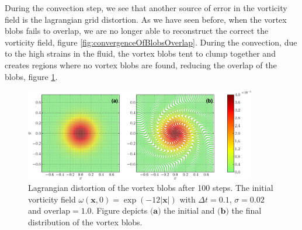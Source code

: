 During the convection step, we see that another source of error in the vorticity field is the lagrangian grid distortion. As we have seen before, when the vortex blobs fails to overlap, we are no longer able to reconstruct the correct the vorticity field, figure \ref{fig:convergenceOfBlobsOverlap}. During the convection, due to the high strains in the fluid, the vortex blobs tent to clump together and creates regions where no vortex blobs are found, reducing the overlap of the blobs, figure \ref{fig:distortion}. 


	\begin{figure}[!b]
	\centering
	\includegraphics[width=0.9\textwidth]{figures/lagrangian/distortion-crop.pdf}
    \caption{Lagrangian distortion of the vortex blobs after 100 steps. The initial vorticity field $\omega\left(\mathbf{x},0\right) = \exp\left(-12\left|\mathbf{x}\right|\right)$ with $\Delta t = 0.1$, $\sigma=0.02$ and $\mathrm{overlap} = 1.0$. Figure depicts $\textbf{(a)}$ the initial and $\textbf{(b)}$ the final distribution of the vortex blobs.}
    \label{fig:distortion}
	\end{figure}


